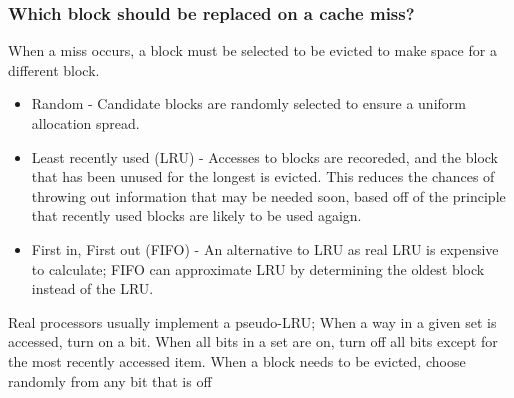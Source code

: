 \subsubsection{Which block should be replaced on a cache miss?}
When a miss occurs, a block must be selected to be evicted to make space for a different block. 
\begin{itemize} 
  \item Random - Candidate blocks are randomly selected to ensure a uniform allocation spread. 
  \item Least recently used (LRU) - Accesses to blocks are recoreded, and the block that has been unused for the longest is evicted. This reduces the chances of throwing out information that may be needed soon, based off of the principle that recently used blocks are likely to be used agaign.
  \item First in, First out (FIFO) - An alternative to LRU as real LRU is expensive to calculate; FIFO can approximate LRU by determining the oldest block instead of the LRU.
\end{itemize}
Real processors usually implement a pseudo-LRU; When a way in a given set is accessed, turn on a bit. When all bits in a set are on, turn off all bits except for the most recently accessed item. When a block needs to be evicted, choose randomly from any bit that is off
